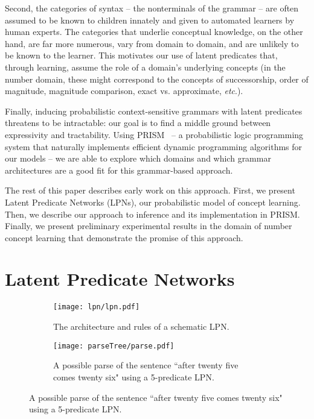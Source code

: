 \documentclass{article} %
\begin{document}
Second, the categories of syntax -- the nonterminals of the grammar --
are often assumed to be known to children innately and given to
automated learners by human experts. The categories that underlie
conceptual knowledge, on the other hand, are far more numerous, vary
from domain to domain, and are unlikely to be known to the
learner. This motivates our use of latent predicates that, through
learning, assume the role of a domain's underlying concepts (in the
number domain, these might correspond to the concepts of
successorship, order of magnitude, magnitude comparison, exact
vs. approximate, {\it etc}.).

Finally, inducing probabilistic context-sensitive grammars with latent
predicates threatens to be intractable: our goal is to find a
middle ground between expressivity and tractability. Using
PRISM~\cite{DBLP:journals/jair/SatoK01} -- a probabilistic logic programming system that naturally
implements efficient dynamic programming algorithms for our models --
we are able to explore which domains and which grammar architectures
are a good fit for this grammar-based approach.

The rest of this paper describes early work on this approach. First,
we present Latent Predicate Networks (LPNs), our probabilistic model
of concept learning. Then, we describe our approach to inference and
its implementation in PRISM. Finally, we present preliminary
experimental results in the domain of number concept learning that
demonstrate the promise of this approach.

\section{Latent Predicate Networks}

\begin{figure}[t]
  \begin{subfigure}[b]{0.5\linewidth}
    \texttt{[image: lpn/lpn.pdf]}
    \caption{The architecture and rules of a schematic LPN.}
    \label{fig:architecture}
  \end{subfigure}
  \hfill
  \begin{subfigure}[b]{0.5\linewidth}
    \texttt{[image: parseTree/parse.pdf]}
    \caption{A possible parse of the sentence ``after twenty five comes twenty six" using a 5-predicate LPN.}
    \label{fig:parseexample}
  \end{subfigure}
\end{figure}
\end{document}
